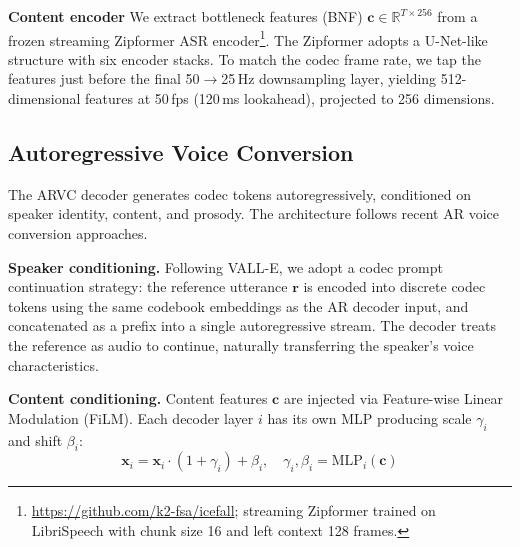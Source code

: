 \documentclass{article}
\begin{document}
\textbf{Content encoder}
We extract bottleneck features (BNF) $\mathbf{c} \in \mathbb{R}^{T \times 256}$ from a frozen streaming Zipformer ASR encoder\footnote{\url{https://github.com/k2-fsa/icefall}; streaming Zipformer trained on LibriSpeech with chunk size 16 and left context 128 frames.}.
The Zipformer adopts a U-Net-like structure with six encoder stacks.
To match the codec frame rate, we tap the features just before the final 50$\to$25\,Hz downsampling layer, yielding 512-dimensional features at 50\,fps (120\,ms lookahead), projected to 256 dimensions.


\subsection{Autoregressive Voice Conversion}
\label{ssec:arvc}

The ARVC decoder generates codec tokens autoregressively, conditioned on speaker identity, content, and prosody.
The architecture follows recent AR voice conversion approaches.

\textbf{Speaker conditioning.}
Following VALL-E, we adopt a codec prompt continuation strategy: the reference utterance $\mathbf{r}$ is encoded into discrete codec tokens using the same codebook embeddings as the AR decoder input, and concatenated as a prefix into a single autoregressive stream.
The decoder treats the reference as audio to continue, naturally transferring the speaker's voice characteristics.

\textbf{Content conditioning.}
Content features $\mathbf{c}$ are injected via Feature-wise Linear Modulation (FiLM).
Each decoder layer $i$ has its own MLP producing scale $\gamma_i$ and shift $\beta_i$:
\begin{equation}
    \mathbf{x}_i = \mathbf{x}_i \cdot (1 + \gamma_i) + \beta_i, \quad \gamma_i, \beta_i = \text{MLP}_i(\mathbf{c})
\end{equation}
\end{document}
